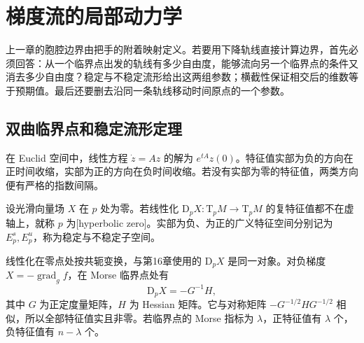 
% 
% 

\section{梯度流的局部动力学}
\label{g2:sec:1801}

上一章的胞腔边界由把手的附着映射定义。若要用下降轨线直接计算边界，首先必须回答：从一个临界点出发的轨线有多少自由度，能够流向另一个临界点的条件又消去多少自由度？稳定与不稳定流形给出这两组参数；横截性保证相交后的维数等于预期值。最后还要删去沿同一条轨线移动时间原点的一个参数。

\subsection{双曲临界点和稳定流形定理}
\label{g2:subsec:1801:01}

在 Euclid 空间中，线性方程 \(\dot z=Az\) 的解为 \(e^{tA}z(0)\)。特征值实部为负的方向在正时间收缩，实部为正的方向在负时间收缩。若没有实部为零的特征值，两类方向便有严格的指数间隔。

\begin{definition}\label{g2:def:hyperbolic-zero}
	设光滑向量场 \(X\) 在 \(p\) 处为零。若线性化 \(\mathrm D_pX:\mathrm T_pM\to\mathrm T_pM\) 的复特征值都不在虚轴上，就称 \(p\) 为[hyperbolic zero]。实部为负、为正的广义特征空间分别记为 \(E^s_p,E^u_p\)，称为稳定与不稳定子空间。
\end{definition}

线性化在零点处按共轭变换，与第16章使用的 \(\mathrm D_pX\) 是同一对象。对负梯度 \(X=-\operatorname{grad}_g f\)，在 Morse 临界点处有
\[
	\mathrm D_pX=-G^{-1}H,
\]
其中 \(G\) 为正定度量矩阵，\(H\) 为 Hessian 矩阵。它与对称矩阵 \(-G^{-1/2}HG^{-1/2}\) 相似，所以全部特征值实且非零。若临界点的 Morse 指标为 \(\lambda\)，正特征值有 \(\lambda\) 个，负特征值有 \(n-\lambda\) 个。

